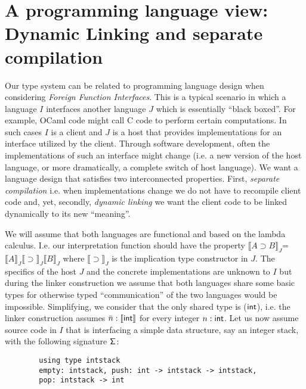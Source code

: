         \section{A programming language view: Dynamic Linking and separate compilation}
        \label{dlinker}
        Our type system can be related to programming language design when considering \textit{Foreign Function Interfaces}. This is a typical scenario in which a language $I$ interfaces another language $J$ which is  essentially ``black boxed''.
        For example, {\sf OCaml} code  might call {\sf C} code to perform certain computations. 
        In such cases $I$ is a client and $J$ is a host that provides implementations for an interface utilized by the client.
        Through software development,  often the implementations of such an interface might change (i.e. a new version of the host language, or more dramatically, a complete switch of host language). 
        We want a language design that satisfies
        two  interconnected 
        properties. First, \textit{separate compilation} i.e. when implementations change we do not have to recompile client code and, yet, 
        secondly, \textit{dynamic linking} we want the client code to be linked dynamically to its new 
        ``meaning''.
        
        We will assume that both languages are  functional and based on the lambda calculus. I.e. our interpretation function should have the property $\llbracket A\supset B\rrbracket_J$=
        $\llbracket A\rrbracket_J \llbracket\supset\rrbracket_J \llbracket B\rrbracket_J$ where  $\llbracket\supset\rrbracket_J$ is the implication type constructor in $J$.
        The specifics of the host  $J$ and the concrete implementations are unknown to $I$ but during the linker construction we assume that both languages share  some  basic types
        for otherwise  typed ``communication'' of the two languages would be impossible. 
        Simplifying,  we consider that the only  shared type is  (${\sf int}$), i.e. the linker construction assumes  
        $\bar{n}:\llbracket \sf int \rrbracket$ for every integer $n:{\sf int}$. 
        Let us now assume source code in $I$ that
        is  interfacing   a simple data structure, say an  integer stack,  with the following signature ${\sf \Sigma}$:
        \begin{lstlisting} 
        using type intstack
        empty: intstack, push: int -> intstack -> intstack,
        pop: intstack -> int
        \end{lstlisting}
        
